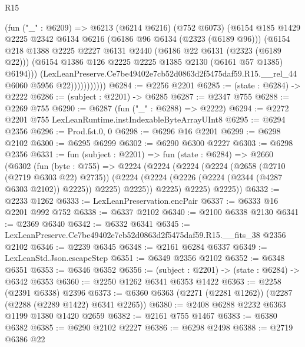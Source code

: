 \begin{lexlean}{R15}
\begin{coremodule}
                      (fun ("_" : @6209) =>
                      @6213
                        (@6214 @6216)
                        (@752 @6073)
                        (@6154
                          @185
                          @1429
                          @2225
                          @2342
                          @6134
                          @6216
                          (@6186 @96 @6134 (@2323 (@6189 @96)))
                          (@6154
                            @218
                            @1388
                            @2225
                            @2227
                            @6131
                            @2440
                            (@6186 @22 @6131 (@2323 (@6189 @22)))
                            (@6154 @1386 @126 @2225 @2225 @1385 @2130 (@6161 @57 @1385) @6194)))
                        (LexLeanPreserve.Ce7be49402e7cb52d0863d2f5475daf59.R15.__rel_44
                          @6060
                          @5956
                          @22)))))))))))
@6284 := @2256 @2201
@6285 := (state : @6284) -> @2222
@6286 := (subject : @2201) -> @6285
@6287 := @2347 @755
@6288 := @2269 @755
@6290 := @6287 (fun ("_" : @6288) => @2222)
@6294 := @2272 @2201 @755 LexLeanRuntime.instIndexableByteArrayUInt8
@6295 := @6294 @2356
@6296 := Prod.fst.{0, 0}
@6298 := @6296 @16 @2201
@6299 := @6298 @2102
@6300 := @6295 @6299
@6302 := @6290 @6300 @2227
@6303 := @6298 @2356
@6331 := fun (subject : @2201) =>
  fun (state : @6284) =>
  @2660
    (@6302
      (fun (byte : @755) =>
      @2224
        (@2224
          (@2224
            (@2224
              (@2658 (@2710 (@2719 @6303 @22) @2735))
              (@2224 (@2224 (@2226 (@2224 (@2344 (@4287 @6303 @2102)) @2225)) @2225) @2225))
            @2225)
          @2225)
        @2225))
@6332 := @2233 @1262
@6333 := LexLeanPreservation.encPair
@6337 := @6333 @16 @2201 @992 @752
@6338 := @6337 @2102
@6340 := @2100 @6338 @2130
@6341 := @2369 @6340
@6342 := @6332 @6341
@6345 := LexLeanPreserve.Ce7be49402e7cb52d0863d2f5475daf59.R15.__fits_38 @2356 @2102
@6346 := @2239 @6345
@6348 := @2161 @6284 @6337
@6349 := LexLeanStd.Json.escapeStep
@6351 := @6349 @2356 @2102
@6352 := @6348 @6351
@6353 := @6346 @6352
@6356 := (subject : @2201) -> (state : @6284) -> @6342 @6353
@6360 := @2250 @1262 @6341 @6353 @1422
@6363 := @2258 (@2391 @6338) @2396
@6373 := @6360 @6363 (@2271 (@2281 @1262)) (@2287 (@2288 (@2289 @1422) @6341 @2265))
@6380 := @2408 @6288 @2232 @6363 @1199 @1380 @1420 @2659
@6382 := @2161 @755 @1467
@6383 := @6380 @6382
@6385 := @6290 @2102 @2227
@6386 := @6298 @2498
@6388 := @2719 @6386 @22

\end{coremodule}
\end{lexlean}
